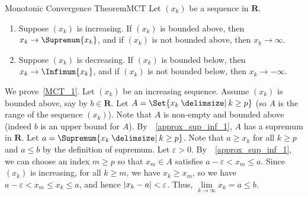 \begin{Theorem}{Monotonic Convergence Theorem}{MCT}
    Let $ (x_k) $ be a sequence in $ \mathbf{R} $.
    \begin{enumerate}[(1)]
        \item\label{MCT_1} Suppose $ (x_k) $ is increasing. If $ (x_k) $ is
              bounded above, then $ x_k\to\Supremum{x_k} $, and if
              $ (x_k) $ is not bounded above, then $ x_k\to\infty $.
        \item\label{MCT_2} Suppose $ (x_k) $ is decreasing. If $ (x_k) $ is
              bounded below, then $ x_k\to\Infimum{x_k} $, and if
              $ (x_k) $ is not bounded below, then $ x_k\to-\infty $.
    \end{enumerate}
\end{Theorem}
\begin{Proof}{}{}
    We prove~\ref{MCT_1}. Let $ (x_k) $ be an increasing sequence.
    Assume $ (x_k) $ is bounded above, say by $ b\in\mathbf{R} $.
    Let $ A=\Set{x_k\given k\ge p} $ (so $ A $ is the range of
    the sequence $ (x_k) $). Note that $ A $ is
    non-empty and bounded above (indeed $ b $ is an upper bound for
    $ A $). By~~\ref{approx_sup_inf_1},
    $ A $ has a supremum in $ \mathbf{R} $. Let $ a=\Supremum{x_k\given k\ge p} $.
    Note that $ a\ge x_k $ for all $ k\ge p $ and $ a\le b $
    by the definition of supremum. Let $ \varepsilon>0 $. By~~\ref{approx_sup_inf_1},
    we can choose an index $ m\ge p $ so that $ x_m\in A $ satisfies
    $ a-\varepsilon<x_m\le a $. Since $ (x_k) $ is increasing, for all
    $ k\ge m $, we have $ x_k\ge x_m $, so we have
    $ a-\varepsilon<x_m\le x_k\le a $, and hence $ \lvert x_k-a\rvert<\varepsilon $.
    Thus, $ \lim\limits_{{k} \to {\infty}} x_k=a\le b $.
\end{Proof}
